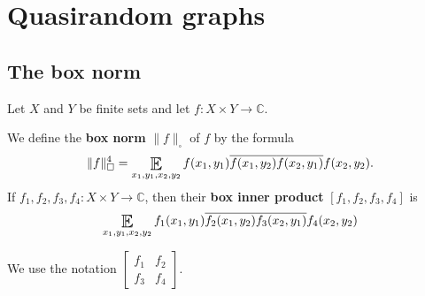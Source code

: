 \documentclass{article}
\DeclareMathOperator*{\E}{\scalerel*{\mathbb{E}}{\textstyle\sum}}
\newcommand{\1}[1]{\mathbbm{1}_{#1}}
\begin{document}
\clearpage
\section{Quasirandom graphs}
\subsection{The box norm}
Let $X$ and $Y$ be finite sets and let $f: X \times Y \to \mathbb{C}$.
\begin{defi}
We define the \textbf{box norm} $\|f\|_\square$ of $f$ by the formula
\begin{equation*}
  \|f\|^4_\square = \E_{x_1, y_1, x_2, y_2} f(x_1, y_1) \overline{f(x_1, y_2)} \overline{f(x_2, y_1)} f(x_2, y_2).
\end{equation*}
If $f_1, f_2, f_3, f_4: X \times Y \to \mathbb{C}$, then their \textbf{box inner product} $[f_1, f_2, f_3, f_4]$ is
\begin{equation*}
  \E_{x_1, y_1, x_2, y_2} f_1(x_1, y_1) \overline{f_2(x_1, y_2)} \overline{f_3(x_2, y_1)} f_4(x_2, y_2)
\end{equation*}
\end{defi}

We use the notation $\begin{bmatrix} f_1 & f_2 \\ f_3 & f_4\end{bmatrix}$.
\end{document}
